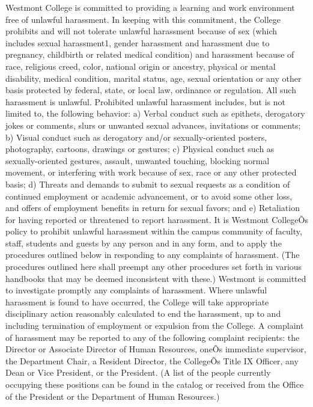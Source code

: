 \documentclass[letterpaper, 11pt]{article}
\begin{document}
   Westmont College is committed to providing a learning and work environment free of unlawful harassment.  In keeping with this commitment, the College prohibits and will not tolerate unlawful harassment because of sex (which includes sexual harassment1, gender harassment and harassment due to pregnancy, childbirth or related medical condition) and harassment because of race, religious creed, color, national origin or ancestry, physical or mental disability, medical condition, marital status, age, sexual orientation or any other basis protected by federal, state, or local law, ordinance or regulation.  All such harassment is unlawful.
   Prohibited unlawful harassment includes, but is not limited to, the following behavior:
a) Verbal conduct such as epithets, derogatory jokes or comments, slurs or unwanted sexual advances, invitations or comments;
b) Visual conduct such as derogatory and/or sexually-oriented posters, photography, cartoons, drawings or gestures;
c) Physical conduct such as sexually-oriented gestures, assault, unwanted touching, blocking normal movement, or interfering with work because of sex, race or any other protected basis;
d) Threats and demands to submit to sexual requests as a condition of continued employment or academic advancement, or to avoid some other loss, and offers of employment benefits in return for sexual favors; and
e) Retaliation for having reported or threatened to report harassment.
   It is Westmont CollegeÕs policy to prohibit unlawful harassment within the campus community of faculty, staff, students and guests by any person and in any form, and to apply the procedures outlined below in responding to any complaints of harassment.  (The procedures outlined here shall preempt any other procedures set forth in various handbooks that may be deemed inconsistent with these.)  Westmont is committed to investigate promptly any complaints of harassment.  Where unlawful harassment is found to have occurred, the College will take appropriate disciplinary action reasonably calculated to end the harassment, up to and including termination of employment or expulsion from the College.
   A complaint of harassment may be reported to any of the following complaint recipients:  the Director or Associate Director of Human Resources, oneÕs immediate supervisor, the Department Chair, a Resident Director, the CollegeÕs Title IX Officer, any Dean or Vice President, or the President.  (A list of the people currently occupying these positions can be found in the catalog or received from the Office of the President or the Department of Human Resources.)
\end{document}
